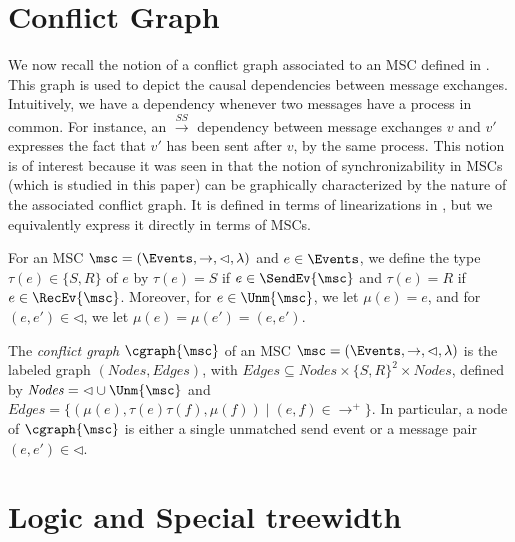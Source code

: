 \section{Conflict Graph}


We now recall the notion of a conflict graph associated to an MSC defined in \cite{DBLP:conf/cav/BouajjaniEJQ18}. This graph is used to depict the causal dependencies between message exchanges.  Intuitively, we have a dependency whenever
two messages have a process in common. For instance, an $\xrightarrow{SS}$
dependency between message exchanges $v$ and $v'$ expresses the fact that
$v'$ has been sent after $v$, by the same process. This notion is of interest because it was seen in \cite{DBLP:conf/cav/BouajjaniEJQ18} that the notion of synchronizability in MSCs (which is studied in this paper) can be graphically characterized by the nature of the associated conflict graph.
It is defined in terms of linearizations
in \cite{DBLP:conf/fossacs/GiustoLL20}, but we equivalently express it
directly in terms of MSCs.

\newcommand{\type}{\tau}
\newcommand{\stype}{S}
\newcommand{\rtype}{R}
\newcommand{\mexch}{\mu}
\newcommand{\Edges}{\mathit{Edges}}
\newcommand{\Nodes}{\mathit{Nodes}}

For an MSC $\msc = (\Events, \rightarrow, \lhd, \lambda)$ and
$e \in \Events$, we define the type $\type(e) \in \{\stype,\rtype\}$ of $e$ by $\type(e) = \stype$ if $e \in \SendEv{\msc}$
and $\type(e) = \rtype$ if $e \in \RecEv{\msc}$.
Moreover, for $e \in \Unm{\msc}$, we let $\mexch(e) = e$,
and for $(e,e') \in \lhd$, we let $\mexch(e) = \mexch(e') = (e,e')$.


\begin{definition}
	The \emph{conflict graph} $\cgraph{\msc}$ of an MSC $\msc = (\Events, \rightarrow, \lhd, \lambda)$ is the labeled graph $(\Nodes, \Edges)$, with $\Edges \subseteq \Nodes \times \{\stype,\rtype\}^2 \times \Nodes$, defined by
	$\Nodes = {\lhd} \cup \Unm{\msc}$ and $\Edges = \{(\mu(e),\type(e)\type(f),\mu(f)) \mid (e,f) \in {\to^+}\}$.
In particular, a node of $\cgraph{\msc}$ is either a single unmatched send event or a message pair $(e,e') \in {\lhd}$.
\end{definition}	

\section{Logic and Special treewidth}

